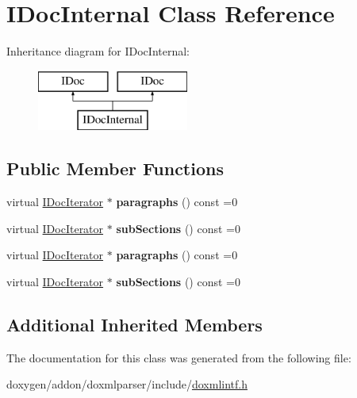 \hypertarget{class_i_doc_internal}{}\section{I\+Doc\+Internal Class Reference}
\label{class_i_doc_internal}
Inheritance diagram for I\+Doc\+Internal\+:\begin{figure}[H]
\begin{center}
\leavevmode
\includegraphics[height=2.000000cm]{class_i_doc_internal}
\end{center}
\end{figure}
\subsection*{Public Member Functions}
\begin{DoxyCompactItemize}
\item 
\mbox{\label{class_i_doc_internal_ae864529e52717578f8fdaf716be269dd}} 
virtual \mbox{\hyperlink{class_i_doc_iterator}{I\+Doc\+Iterator}} $\ast$ {\bfseries paragraphs} () const =0
\item 
\mbox{\label{class_i_doc_internal_a14894cba397385d0a0c4233a6e595c31}} 
virtual \mbox{\hyperlink{class_i_doc_iterator}{I\+Doc\+Iterator}} $\ast$ {\bfseries sub\+Sections} () const =0
\item 
\mbox{\label{class_i_doc_internal_ae864529e52717578f8fdaf716be269dd}} 
virtual \mbox{\hyperlink{class_i_doc_iterator}{I\+Doc\+Iterator}} $\ast$ {\bfseries paragraphs} () const =0
\item 
\mbox{\label{class_i_doc_internal_a14894cba397385d0a0c4233a6e595c31}} 
virtual \mbox{\hyperlink{class_i_doc_iterator}{I\+Doc\+Iterator}} $\ast$ {\bfseries sub\+Sections} () const =0
\end{DoxyCompactItemize}
\subsection*{Additional Inherited Members}


The documentation for this class was generated from the following file\+:\begin{DoxyCompactItemize}
\item 
doxygen/addon/doxmlparser/include/\mbox{\hyperlink{include_2doxmlintf_8h}{doxmlintf.\+h}}\end{DoxyCompactItemize}

